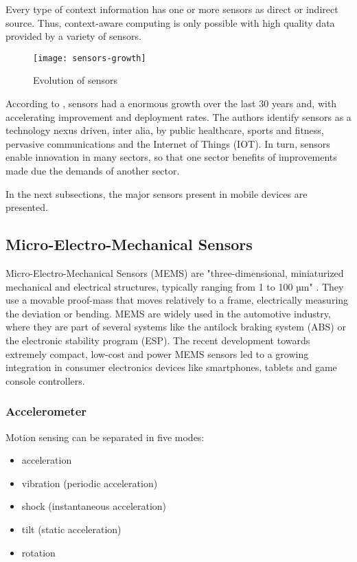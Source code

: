 Every type of context information has one or more sensors as direct or indirect source. Thus, context-aware computing is only possible with high quality data provided by a variety of sensors.

\begin{figure}[H]
\centering
\texttt{[image: sensors-growth]}
\caption{Evolution of sensors \cite[Ch. 1]{sensors-book}}
\end{figure}

According to \cite{sensors-book}, sensors had a enormous growth over the last 30 years and, with accelerating improvement and deployment rates. The authors identify sensors as a technology nexus driven, inter alia, by public healthcare, sports and fitness, pervasive communications and the Internet of Things (IOT). In turn, sensors enable innovation in many sectors, so that one sector benefits of improvements made due the demands of another sector. 

In the next subsections, the major sensors present in mobile devices are presented.

\subsection{Micro-Electro-Mechanical Sensors}

Micro-Electro-Mechanical Sensors (MEMS) are "three-dimensional, miniaturized mechanical and electrical structures, typically ranging from 1 to 100 µm" \cite[Ch. 2]{sensors-book}. They use a movable proof-mass that moves relatively to a frame, electrically measuring the deviation or bending. MEMS are widely used in the automotive industry, where they are part of several systems like the antilock braking system (ABS) or the electronic stability program (ESP). The recent development towards extremely compact, low-cost and power MEMS sensors led to a growing integration in consumer electronics devices like smartphones, tablets and game console controllers. 


\subsubsection*{Accelerometer}

Motion sensing can be separated in five modes: 
\begin{itemize}[noitemsep,nolistsep]
 \item acceleration
 \item vibration (periodic acceleration)
 \item shock (instantaneous acceleration)
 \item tilt (static acceleration)
 \item rotation
\end{itemize}

